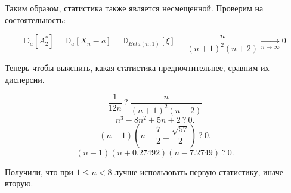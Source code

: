 \documentclass[14pt]{extarticle}
\begin{document}
Таким образом, статистика также является несмещенной. Проверим на состоятельность:

$$
\mathbb D_a[A_2^*] = \mathbb D_a[X_n - a] = \mathbb D_{Beta(n, 1)}[\xi] = 
\frac{n}{(n+1)^2(n+2)}\underset{n\rightarrow\infty}{\longrightarrow}0
$$

Теперь чтобы выяснить, какая статистика предпочтительнее, сравним их дисперсии. 

$$\frac{1}{12n}~ ? ~ \frac{n}{(n+1)^2(n+2)} $$
$$ n^3 - 8n^2 + 5n + 2 ~ ? ~ 0.$$
$$ (n-1)(n-\frac{7}{2} \pm \frac{\sqrt{57}}{2}) ~ ? ~ 0.$$
$$ (n-1)(n+0.27492)(n-7.2749) ~ ? ~ 0.$$

Получили, что при $1\leqslant n < 8$ лучше использовать первую статистику, иначе вторую.
\end{document}
